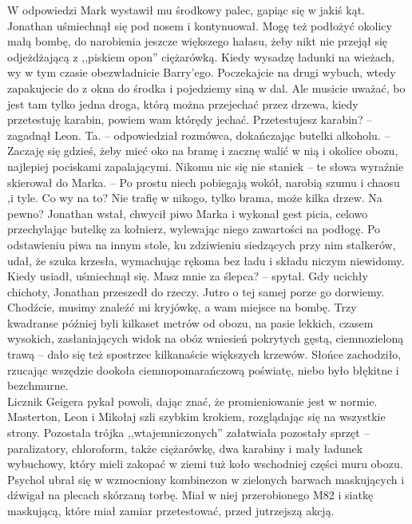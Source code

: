 \documentclass[../MAIN.tex]{subfiles}
\begin{document}
\qd
W odpowiedzi Mark wystawił mu środkowy palec, gapiąc się w jakiś kąt. \\
Jonathan uśmiechnął się pod nosem i kontynuował.
\sx Mogę też podłożyć okolicy małą bombę, do narobienia jeszcze większego hałasu, żeby nikt nie przejął się odjeżdżającą z ,,piskiem opon'' ciężarówką.
 Kiedy wysadzę ładunki na wieżach, wy w tym czasie obezwładnicie Barry’ego. Poczekajcie na drugi wybuch, wtedy zapakujecie do z okna do środka i pojedziemy siną w dal. Ale musicie uważać, bo jest tam tylko jedna droga, którą można przejechać przez drzewa, kiedy przetestuję karabin, powiem wam którędy jechać.
\xx Przetestujesz karabin? -- zagadnął Leon.
\xx Ta. -- odpowiedział rozmówca, dokańczając butelki alkoholu. -- Zaczaję się gdzieś, żeby mieć oko na bramę i zacznę walić w nią i okolice obozu, najlepiej pociskami zapalającymi. Nikomu nic się nie stanie\3k -- te słowa wyraźnie skierował do Marka. -- Po prostu niech pobiegają wokół, narobią szumu i chaosu ,i tyle.
\xx Co wy na to? Nie trafię w nikogo, tylko brama, może kilka drzew.
\xx Na pewno? \qd
Jonathan wstał, chwycił piwo Marka i wykonał gest picia, celowo przechylając butelkę za kołnierz, wylewając niego zawartości na podłogę. Po odstawieniu piwa na innym stole, ku zdziwieniu siedzących przy nim stalkerów, udał, że szuka krzesła, wymachując rękoma bez ładu i składu niczym niewidomy. Kiedy usiadł, uśmiechnął się.
\sx Masz mnie za ślepca? -- spytał. Gdy ucichły chichoty, Jonathan przeszedł do rzeczy.
\xx Jutro o tej samej porze go dorwiemy. Chodźcie, musimy znaleźć mi kryjówkę, a wam miejsce na bombę. \qd
%
%
Trzy kwadranse później byli kilkaset metrów od obozu, na pasie lekkich, czasem wysokich, zasłaniających widok na obóz wniesień pokrytych gęstą, ciemnozieloną trawą -- dało się też spostrzec kilkanaście większych krzewów. Słońce zachodziło, rzucając wszędzie dookoła ciemnopomarańczową poświatę, niebo było błękitne i bezchmurne. \\
Licznik Geigera pykał powoli, dając znać, że promieniowanie jest w normie. Masterton, Leon i Mikołaj szli szybkim krokiem, rozglądając się na wszystkie strony. Pozostała trójka ,,wtajemniczonych'' załatwiała pozostały sprzęt -- paralizatory, chloroform, także ciężarówkę, dwa karabiny i mały ładunek wybuchowy, który mieli zakopać w ziemi tuż koło wschodniej części muru obozu. Psychol ubrał się w wzmocniony kombinezon w zielonych barwach maskujących i dźwigał na plecach skórzaną torbę. Miał w niej przerobionego M82 i siatkę maskującą, które miał zamiar przetestować, przed jutrzejszą akcją. \\
\end{document}
